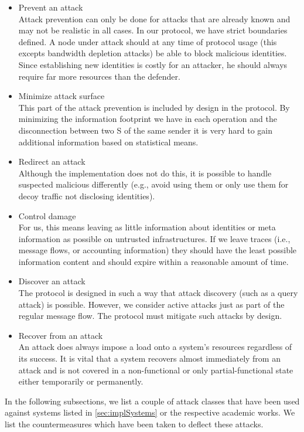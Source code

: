 \begin{itemize}
	\item Prevent an attack\\
	Attack prevention can only be done for attacks that are already known and may not be realistic in all cases. In our protocol, we have strict boundaries defined. A node under attack should at any time of protocol usage (this excepts bandwidth depletion attacks) be able to block malicious identities. Since establishing new identities is costly for an attacker, he should always require far more resources than the defender.
	\item Minimize attack surface\\
	This part of the attack prevention is included by design in the protocol. By minimizing the information footprint we have in each operation and the disconnection between two S of the same sender it is very hard to gain additional information based on statistical means.
	\item Redirect an attack\\
	Although the implementation does not do this, it is possible to handle suspected malicious \VortexNode{} differently (e.g., avoid using them or only use them for decoy traffic not disclosing identities).
	\item Control damage\\
	For us, this means leaving as little information about identities or meta information as possible on untrusted infrastructures. If we leave traces (i.e., message flows, or accounting information) they should have the least possible information content and should expire within a reasonable amount of time.
	\item Discover an attack\\
	The protocol is designed in such a way that attack discovery (such as a query attack) is possible. However, we consider active attacks just as part of the regular message flow. The protocol must mitigate such attacks by design.
	\item Recover from an attack\\
	An attack does always impose a load onto a system's resources regardless of its success. It is vital that a system recovers almost immediately from an attack and is not covered in a non-functional or only partial-functional state either temporarily or permanently.
\end{itemize}

In the following subsections, we list a couple of attack classes that have been used against systems listed in \ref{sec:implSystems} or the respective academic works. We list the countermeasures which have been taken to deflect these attacks.

